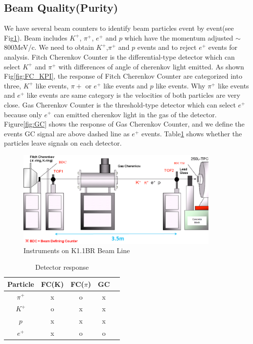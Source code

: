 \subsection{Beam Quality(Purity)}

We have several beam counters to identify beam particles event by event(see Fig\ref{fig:Beamline}).
Beam includes $K^{+}$, $\pi^{+}$, $e^{+}$ and $p$ which have the momentum adjusted $\sim$800MeV/c.
We need to obtain $K^{+}$,$\pi^{+}$ and $p$ events and to reject $e^{+}$ events for analysis.
Fitch Cherenkov Counter is the differential-type detector which can select $K^{+}$ and $\pi^{+}$ with differences of angle of cherenkov light emitted.
As shown Fig\ref{fig:FC_KPI}, the response of Fitch Cherenkov Counter are categorized into three, $K^{+}$ like events, $\pi{+}$ or $e^{+}$ like events and $p$ like events.
Why $\pi^{+}$ like events and $e^{+}$ like events are same category is the velocities of both particles are very close.
Gas Cherenkov Counter is the threshold-type detector which can select $e^{+}$ because only $e^{+}$ can emitted cherenkov light in the gas of the detector.
Figure\ref{fig:GC} shows the response of Gas Cherenkov Counter, and we define the events GC signal are above dashed line as $e^{+}$ events.
Table\ref{tb:Summary} shows whether the particles leave signals on each detector.\\

\begin{figure}[htbp]
  \centering
  \includegraphics[width=10cm,clip]{fig/Beamline.eps}
  \caption{Instruments on K1.1BR Beam Line}
  \label{fig:Beamline}
\end{figure}

\begin{table}
  \centering
  \caption{Detector response}
  \begin{tabular}[htb]{c|cccc} \hline
    Particle  & FC(K) & FC($\pi$) & GC \\ \hline
    $\pi^{+}$ & x     & o         & x  \\
    $K^{+}$   & o     & x         & x  \\ 
    $p$       & x     & x         & x  \\ 
    $e^{+}$   & x     & o         & o  \\ \hline
  \end{tabular}
  \label{tb:Summary}
\end{table}

